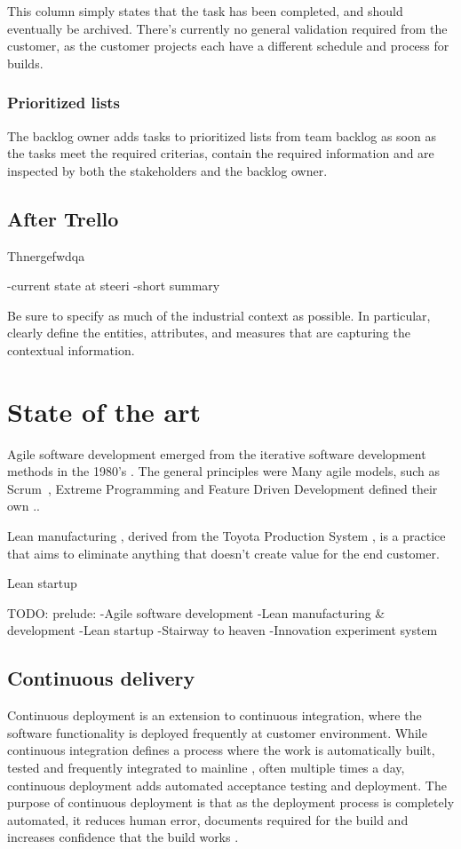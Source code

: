 \documentclass[english]{tktltiki2}
\theoremstyle{definition}
\theoremstyle{remark}
\begin{document}
This column simply states that the task has been completed, and should eventually be archived. There’s currently no general validation required from the customer, as the customer projects each have a different schedule and process for builds.
\subsubsection{Prioritized lists}

The backlog owner adds tasks to prioritized lists from team backlog as soon as the tasks meet the required criterias, contain the required information and are inspected by both the stakeholders and the backlog owner.

\subsection{After Trello}
Thnergefwdqa

\cite{olsson2012climbing}

-current state at steeri
    -short summary

Be sure to specify as much of the industrial context as possible. In particular,
clearly deﬁne the entities, attributes, and measures that are capturing the contextual information.

\section{State of the art}

Agile software development emerged from the iterative software development methods in the 1980's \cite{}. The general principles were
Many agile models, such as Scrum \cite{}, Extreme Programming \cite{} and Feature Driven Development \cite{} defined their own ..

Lean manufacturing \cite{}, derived from the Toyota Production System \cite{}, is a practice that aims to eliminate anything that doesn't create value for the end customer. 

Lean startup  

TODO: prelude:
-Agile software development
-Lean manufacturing & development
-Lean startup
-Stairway to heaven
-Innovation experiment system

\subsection{Continuous delivery}
Continuous deployment is an extension to continuous integration, where the software functionality is deployed frequently at customer environment. While continuous integration defines a process where the work is automatically built, tested and frequently integrated to mainline \cite{fowler2006continuous}, often multiple times a day, continuous deployment adds automated acceptance testing and deployment. The purpose of continuous deployment is that as the deployment process is completely automated, it reduces human error, documents required for the build and increases confidence that the build works \cite{cdbook}. 
\end{document}
